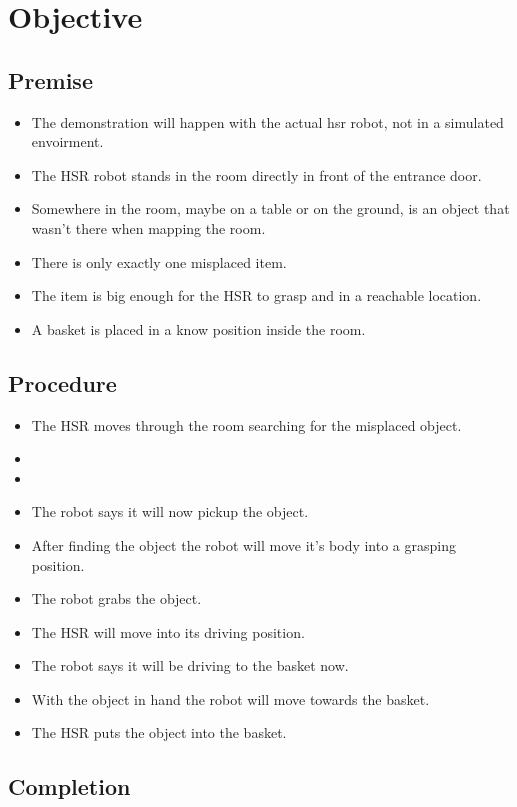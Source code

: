 \documentclass[main.tex]{subfiles}
\begin{document}
	
	\chapter{Objective}
	\section{Premise}
		\begin{itemize}
			\item The demonstration will happen with the actual hsr robot, not in a simulated envoirment.
			\item The HSR robot stands in the room directly in front of the entrance door.
			\item Somewhere in the room, maybe on a table or on the ground, is an object that wasn't there when mapping the room.
			\item There is only exactly one misplaced item.
			\item The item is big enough for the HSR to grasp and in a reachable location.
			\item A basket is placed in a know position inside the room.
		\end{itemize} 
		
	\section{Procedure}
		\begin{itemize}
			\item The HSR moves through the room searching for the misplaced object.
			\item {}
			\item 
			\item The robot says it will now pickup the object.
			\item After finding the object the robot will move it's body into a grasping position.
			\item The robot grabs the object.
			\item The HSR will move into its driving position.
			\item The robot says it will be driving to the basket now.
			\item With the object in hand the robot will move towards the basket.
			\item The HSR puts the object into the basket.			
		\end{itemize}
	\section{Completion}
\end{document}
